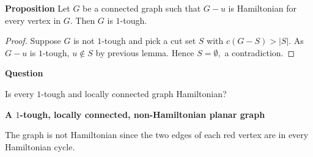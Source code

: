 \documentclass{beamer}
\theoremstyle{plain}
\theoremstyle{definition}
\begin{document}
\begin{frame}{\bf Proposition} 
Let $G$ be a connected graph such that  $G-u$ is Hamiltonian for every vertex in $G$.  Then $G$ is $1$-tough. 
\begin{proof}
Suppose $G$ is not $1$-tough and pick a cut set $S$ with $c(G-S)> |S|$. 
As $G-u$  is $1$-tough, $u\not\in S$ by previous lemma. Hence $S=\emptyset,$ a contradiction. 
\end{proof}

\end{frame}

\begin{frame}{\bf Question}

Is every $1$-tough and  locally connected graph Hamiltonian?


\end{frame}


\begin{frame}{\bf A $1$-tough, locally connected, non-Hamiltonian planar graph}
\begin{center}
\end{center}


\bigskip


The graph is not Hamiltonian since the two edges of  each red vertex are in every Hamiltonian cycle.

\end{frame}
\end{document}
